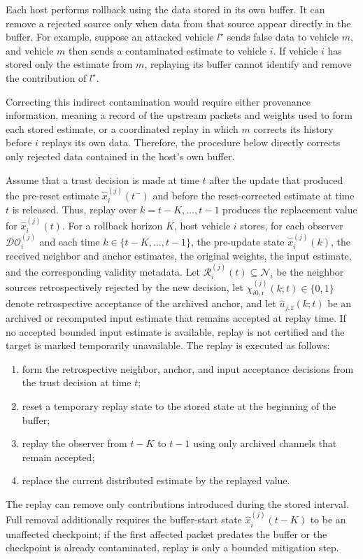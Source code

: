 \documentclass[letterpaper,journal]{IEEEtran}
\def\N{\mathcal{N}} %
\def\DO{\mathcal{DO}} %
\begin{document}
Each host performs rollback using the data stored in its own buffer. It can remove a rejected source only when data from that source appear directly in the buffer. For example, suppose an attacked vehicle $l^{\star}$ sends false data to vehicle $m$, and vehicle $m$ then sends a contaminated estimate to vehicle $i$. If vehicle $i$ has stored only the estimate from $m$, replaying its buffer cannot identify and remove the contribution of $l^{\star}$.

Correcting this indirect contamination would require either provenance information, meaning a record of the upstream packets and weights used to form each stored estimate, or a coordinated replay in which $m$ corrects its history before $i$ replays its own data. Therefore, the procedure below directly corrects only rejected data contained in the host's own buffer.

Assume that a trust decision is made at time $t$ after the update that produced the pre-reset estimate $\hat{x}_i^{(j)}(t^-)$ and before the reset-corrected estimate at time $t$ is released. Thus, replay over $k=t-K,\ldots,t-1$ produces the replacement value for $\hat{x}_i^{(j)}(t)$. For a rollback horizon $K$, host vehicle $i$ stores, for each observer $\DO_i^{(j)}$ and each time $k\in\{t-K,\ldots,t-1\}$, the pre-update state $\hat{x}_i^{(j)}(k)$, the received neighbor and anchor estimates, the original weights, the input estimate, and the corresponding validity metadata. Let $\mathcal{R}_i^{(j)}(t)\subseteq\N_i$ be the neighbor sources retrospectively rejected by the new decision, let $\chi_{i0,\mathrm r}^{(j)}(k;t)\in\{0,1\}$ denote retrospective acceptance of the archived anchor, and let $\hat u_{j,\mathrm r}(k;t)$ be an archived or recomputed input estimate that remains accepted at replay time. If no accepted bounded input estimate is available, replay is not certified and the target is marked temporarily unavailable. The replay is executed as follows:
\begin{enumerate}
    \item form the retrospective neighbor, anchor, and input acceptance decisions from the trust decision at time $t$;
    \item reset a temporary replay state to the stored state at the beginning of the buffer;
    \item replay the observer from $t-K$ to $t-1$ using only archived channels that remain accepted;
    \item replace the current distributed estimate by the replayed value.
\end{enumerate}
The replay can remove only contributions introduced during the stored interval. Full removal additionally requires the buffer-start state $\hat x_i^{(j)}(t-K)$ to be an unaffected checkpoint; if the first affected packet predates the buffer or the checkpoint is already contaminated, replay is only a bounded mitigation step.
\end{document}
